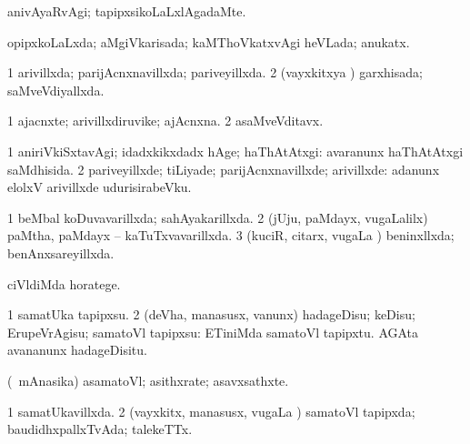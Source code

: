{\bentry
{} 
\gl{\kirxvi}
\expl{}
\bmng
anivAyaRvAgi; tapipxsikoLaLxlAgadaMte. 
\emng
\eentry

\bentry
{} 
\gl{\gu}
\expl{}
\bmng
opipxkoLaLxda; aMgiVkarisada; kaMThoVkatxvAgi heVLada; anukatx. 
\emng
\eentry

\bentry
{} 
\gl{\gu}
\expl{}
\bmng
\bnum
\num{1} arivillxda; parijAcnxnavillxda; pariveyillxda. 
\num{2} (vayxkitxya \vi) garxhisada; saMveVdiyallxda. 
\enum
\emng
\eentry

\bentry
{} 
\gl{\kirxvi}
\expl{}
\bmng
{} 
\emng
\eentry

\bentry
{} 
\gl{\nA}
\expl{}
\bmng
\bnum
\num{1} ajacnxte; arivillxdiruvike; ajAcnxna. 
\num{2} asaMveVditavx. 
\enum
\emng
\eentry

\bentry
{} 
\gl{\kirxvi}
\expl{}
\bmng
\bnum
\num{1} aniriVkiSxtavAgi; idadxkikxdadx hAge; haThAtAtxgi:  avaranunx haThAtAtxgi saMdhisida. 
\num{2} pariveyillxde; tiLiyade; parijAcnxnavillxde; arivillxde:  adanunx elolxV arivillxde udurisirabeVku. 
\enum
\emng
\eentry

\bentry
{} 
\gl{\gu}
\expl{}
\bmng
\bnum
\num{1} beMbal koDuvavarillxda; sahAyakarillxda. 
\num{2} (jUju, paMdayx, \mo vugaLalilx) paMtha, paMdayx -- kaTuTxvavarillxda. 
\num{3} (kuciR, citarx, \mo vugaLa \vi) beninxllxda; benAnxsareyillxda. 
\enum
\emng
\eentry

\bentry
{} 
\gl{\sakirx}
\expl{}
\bmng
ciVldiMda horatege. 
\emng
\eentry

\bentry
{} 
\gl{\sakirx}
\expl{}
\bmng
\bnum
\num{1} samatUka tapipxsu. 
\num{2} (deVha, manasusx, \mo vanunx) hadageDisu; keDisu; ErupeVrAgisu; samatoVl tapipxsu:  ETiniMda samatoVl tapipxtu.  AGAta avananunx hadageDisitu. 
\enum
\emng
\eentry

\bentry
{} 
\gl{\nA}
\expl{}
\bmng
(\kanmu\ mAnasika) asamatoVl; asithxrate; asavxsathxte. 
\emng
\eentry

\bentry
{} 
\gl{\gu}
\expl{}
\bmng
\bnum
\num{1} samatUkavillxda. 
\num{2} (vayxkitx, manasusx, \mo vugaLa \vi) samatoVl tapipxda; baudidhxpallxTvAda; talekeTTx. 
\enum
\emng
\eentry

}
